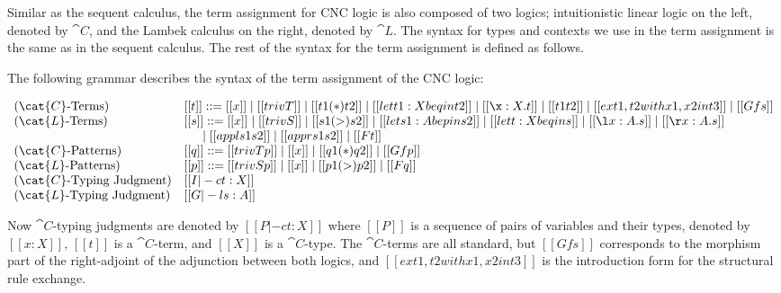 Similar as the sequent calculus, the term assignment for CNC logic is
also composed of two logics; intuitionistic linear logic on the left,
denoted by $\cat{C}$, and the Lambek calculus on the right, denoted by
$\cat{L}$. The syntax for types and contexts we use in the term
assignment is the same as in the sequent calculus. The rest of the
syntax for the term assignment is defined as follows.
\begin{definition}
  \label{def:Lambek-syntax}
  The following grammar describes the syntax of the term assignment of the
  CNC logic:
  \begin{center}\vspace{-3px}\small
    \begin{math}
      \begin{array}{lll}        
        \text{($\cat{C}$-Terms)} & [[t]] ::= [[x]] \mid [[trivT]] \mid [[t1 (*) t2]] \mid [[let t1 : X be q in t2]] \mid [[\x:X.t]] \mid [[t1 t2]] \mid [[ex t1 , t2 with x1 , x2 in t3]] \mid [[Gf s]]\\
        \text{($\cat{L}$-Terms)} & [[s]] ::= [[x]] \mid [[trivS]] \mid [[s1 (>) s2]] \mid [[let s1 : A be p in s2]] \mid [[let t : X be q in s]] \mid [[\l x : A.s]] \mid [[\r x : A . s]] \\
        & \,\,\,\,\,\,\,\,\,\mid [[appl s1 s2]] \mid [[appr s1 s2]] \mid [[F t]]\\        
        \text{($\cat{C}$-Patterns)} & [[q]] ::= [[trivTp]] \mid [[x]] \mid [[q1 (*) q2]] \mid [[Gf p]]\\
        \text{($\cat{L}$-Patterns)} & [[p]] ::= [[trivSp]] \mid [[x]] \mid [[p1 (>) p2]] \mid [[F q]]\\        
        \text{($\cat{C}$-Typing Judgment)} & [[I |-c t : X]]\\
        \text{($\cat{L}$-Typing Judgment)} & [[G |-l s : A]]\\
      \end{array}
    \end{math}
  \end{center}
\end{definition}

Now $\cat{C}$-typing judgments are denoted by $[[P |-c t : X]]$ where
$[[P]]$ is a sequence of pairs of variables and their types, denoted by
$[[x : X]]$, $[[t]]$ is a $\cat{C}$-term, and $[[X]]$ is a $\cat{C}$-type.  
The $\cat{C}$-terms are all standard, but $[[Gf s]]$ corresponds to the
morphism part of the right-adjoint of the adjunction between both logics,
and $[[ex t1 , t2 with x1 , x2 in t3]]$ is the introduction form for the
structural rule exchange.

